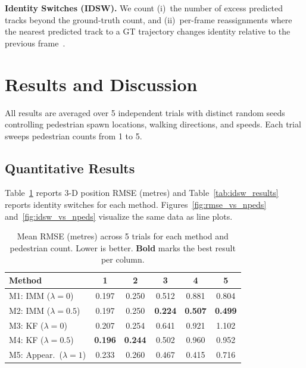 \documentclass[conference]{IEEEtran}
\begin{document}
\textbf{Identity Switches (IDSW).} We count (i)~the number of excess predicted tracks beyond the ground-truth count, and (ii)~per-frame reassignments where the nearest predicted track to a GT trajectory changes identity relative to the previous frame~\cite{bernardin2008evaluating}.

\section{Results and Discussion}
\label{sec:results}

All results are averaged over 5 independent trials with distinct random seeds controlling pedestrian spawn locations, walking directions, and speeds. Each trial sweeps pedestrian counts from 1 to 5.

\subsection{Quantitative Results}

Table~\ref{tab:rmse_results} reports 3-D position RMSE (metres) and Table~\ref{tab:idsw_results} reports identity switches for each method. Figures~\ref{fig:rmse_vs_npeds} and~\ref{fig:idsw_vs_npeds} visualize the same data as line plots.

\begin{table}[!t]
\centering
\caption{Mean RMSE (metres) across 5 trials for each method and pedestrian count. Lower is better. \textbf{Bold} marks the best result per column.}
\label{tab:rmse_results}
\begin{tabular}{@{}lccccc@{}}
\toprule
\textbf{Method} & \textbf{1} & \textbf{2} & \textbf{3} & \textbf{4} & \textbf{5} \\
\midrule
M1: IMM ($\lambda{=}0$)       & 0.197 & 0.250 & 0.512 & 0.881 & 0.804 \\
M2: IMM ($\lambda{=}0.5$)     & 0.197 & 0.250 & \textbf{0.224} & \textbf{0.507} & \textbf{0.499} \\
M3: KF ($\lambda{=}0$)        & 0.207 & 0.254 & 0.641 & 0.921 & 1.102 \\
M4: KF ($\lambda{=}0.5$)      & \textbf{0.196} & \textbf{0.244} & 0.502 & 0.960 & 0.952 \\
M5: Appear.\ ($\lambda{=}1$)  & 0.233 & 0.260 & 0.467 & 0.415 & 0.716 \\
\bottomrule
\end{tabular}
\end{table}
\end{document}
